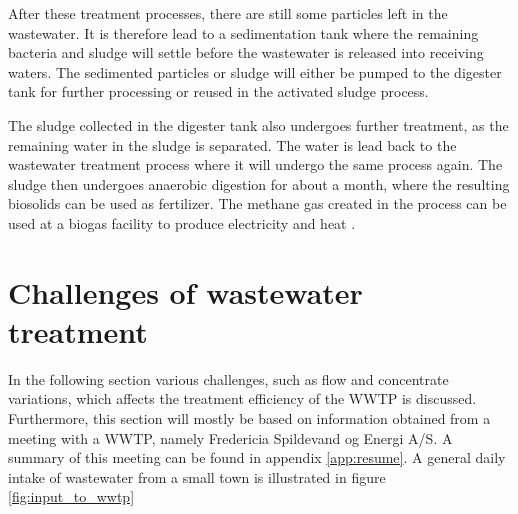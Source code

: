 After these treatment processes, there are still some particles left in the wastewater. It is therefore lead to a sedimentation tank where the remaining bacteria and sludge will settle before the wastewater is released into receiving waters. The sedimented particles or sludge will either be pumped to the digester tank for further processing or reused in the activated sludge process.


The sludge collected in the digester tank also undergoes further treatment, as the remaining water in the sludge is separated. The water is lead back to the wastewater treatment process where it will undergo the same process again. The sludge then undergoes anaerobic digestion for about a month, where the resulting biosolids can be used as fertilizer. The methane gas created in the process can be used at a biogas facility to produce electricity and heat \cite{wwtp_ekstra}.


\section{Challenges of wastewater treatment}\label{sec:WWTP_challenges}
In the following section various challenges, such as flow and concentrate variations, which affects the treatment efficiency of the WWTP is discussed. 
Furthermore, this section will mostly be based on information obtained from a meeting with a WWTP, namely Fredericia Spildevand og Energi A/S. A summary of this meeting can be found in appendix \ref{app:resume}.
A general daily intake of wastewater from a small town is illustrated in figure \ref{fig:input_to_wwtp}  

